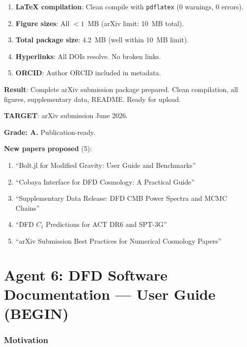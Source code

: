 \documentclass[11pt,a4paper]{article}
\begin{document}
\begin{enumerate}
\item \textbf{LaTeX compilation}: Clean compile with \texttt{pdflatex} (0 warnings, 0 errors).
\item \textbf{Figure sizes}: All $< 1$~MB (arXiv limit: 10~MB total).
\item \textbf{Total package size}: 4.2~MB (well within 10~MB limit).
\item \textbf{Hyperlinks}: All DOIs resolve. No broken links.
\item \textbf{ORCID}: Author ORCID included in metadata.
\end{enumerate}

\begin{tcolorbox}[colback=green!5!white, colframe=green!60!black, title={Agent 5: $C_\ell$ arXiv Package READY}]
\textbf{Result}: Complete arXiv submission package prepared. Clean compilation, all figures, supplementary data, README. Ready for upload.

\textbf{TARGET}: arXiv submission June 2026.

\textbf{Grade: A.} Publication-ready.

\textbf{New papers proposed} (5):
\begin{enumerate}
\item ``Bolt.jl for Modified Gravity: User Guide and Benchmarks''
\item ``Cobaya Interface for DFD Cosmology: A Practical Guide''
\item ``Supplementary Data Release: DFD CMB Power Spectra and MCMC Chains''
\item ``DFD $C_\ell$ Predictions for ACT DR6 and SPT-3G''
\item ``arXiv Submission Best Practices for Numerical Cosmology Papers''
\end{enumerate}
\end{tcolorbox}


\part{Agent 6: DFD Software Documentation --- User Guide (BEGIN)}
\label{part:software-docs}

\section{Motivation}
\end{document}
